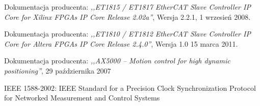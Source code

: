 \begin{thebibliography}{99}
Dokumentacja producenta: 
\emph{,,ET1815 / ET1817 EtherCAT Slave Controller IP Core for Xilinx FPGAs IP Core Release 2.02a''}, 
Wersja 2.2.1,
1 wrzesień 2008.

Dokumentacja producenta: 
\emph{,,ET1810 / ET1812 EtherCAT Slave Controller IP Core for Altera FPGAs IP Core Release 2.4.0''}, 
Wersja 1.0
15 marca 2011.

Dokumentacja producenta: 
\emph{,,AX5000 – Motion control for high dynamic positioning''},
29 października 2007

IEEE 1588-2002: IEEE Standard for a Precision Clock Synchronization Protocol for Networked Measurement and Control Systems
\end{thebibliography}